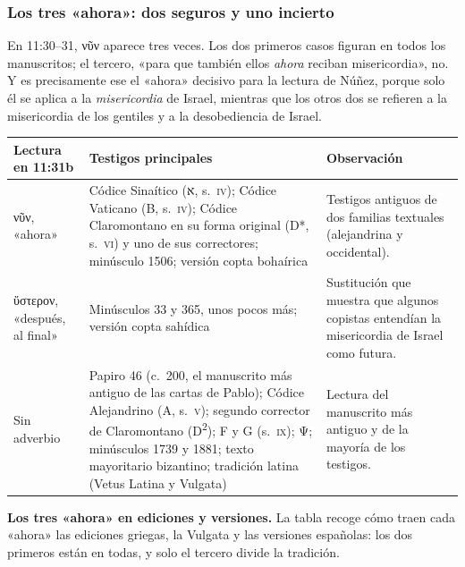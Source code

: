 \documentclass[11pt,letterpaper]{article}
\newcommand{\heb}[1]{\mbox{\foreignlanguage{hebrew}{#1}}}
\newcommand{\grc}[1]{\foreignlanguage{ancientgreek}{#1}}
\begin{document}
\subsubsection*{Los tres «ahora»: dos seguros y uno incierto}

En 11:30--31, \grc{νῦν} aparece tres veces. Los dos primeros casos figuran en todos los manuscritos; el tercero, «para que también ellos \emph{ahora} reciban misericordia», no. Y es precisamente ese el «ahora» decisivo para la lectura de Núñez, porque solo él se aplica a la \emph{misericordia} de Israel, mientras que los otros dos se refieren a la misericordia de los gentiles y a la desobediencia de Israel.

\begin{center}\footnotesize
\renewcommand{\arraystretch}{1.3}
\begin{tabular}{>{\RaggedRight\arraybackslash}p{2.7cm}>{\RaggedRight\arraybackslash}p{6.2cm}>{\RaggedRight\arraybackslash}p{4.9cm}}
\toprule
\textbf{Lectura en 11:31b} & \textbf{Testigos principales} & \textbf{Observación}\\
\midrule
\grc{νῦν}, «ahora» & Códice Sinaítico (\heb{א}, s.~\textsc{iv}); Códice Vaticano (B, s.~\textsc{iv}); Códice Claromontano en su forma original (D*, s.~\textsc{vi}) y uno de sus correctores; minúsculo 1506; versión copta bohaírica & Testigos antiguos de dos familias textuales (alejandrina y occidental).\\
\grc{ὕστερον}, «después, al final» & Minúsculos 33 y 365, unos pocos más; versión copta sahídica & Sustitución que muestra que algunos copistas entendían la misericordia de Israel como futura.\\
Sin adverbio & Papiro 46 (c.~200, el manuscrito más antiguo de las cartas de Pablo); Códice Alejandrino (A, s.~\textsc{v}); segundo corrector de Claromontano (D\textsuperscript{2}); F y G (s.~\textsc{ix}); \grc{Ψ}; minúsculos 1739 y 1881; texto mayoritario bizantino; tradición latina (Vetus Latina y Vulgata) & Lectura del manuscrito más antiguo y de la mayoría de los testigos.\\
\bottomrule
\end{tabular}\end{center}

\medskip
\noindent\textbf{Los tres «ahora» en ediciones y versiones.} La tabla recoge cómo traen cada «ahora» las ediciones griegas, la Vulgata y las versiones españolas: los dos primeros están en todas, y solo el tercero divide la tradición.
\end{document}
